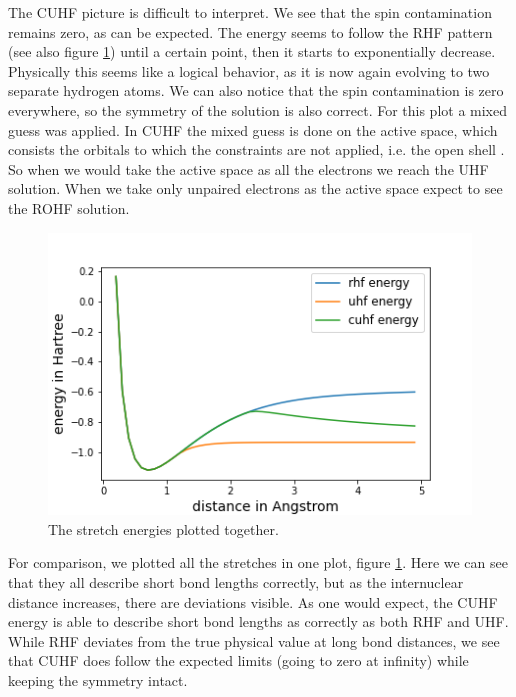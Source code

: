 The CUHF picture is difficult to interpret. We see that the spin contamination remains zero, as can be expected. The energy seems to follow the RHF pattern (see also figure
\ref{fig:combo}) until a certain point, then it starts to exponentially decrease. Physically this seems like a logical behavior, as it is now again evolving to two separate hydrogen
atoms. We can also notice
that the spin contamination is zero everywhere, so the symmetry of the solution is also correct. For this plot a mixed guess was applied. In CUHF the mixed guess is done on the
active space, which consists the orbitals to which the constraints are not applied, i.e. the open shell \cite{Scuseria2011}. So when we would take the active space as all the electrons
we reach the UHF solution. When we take only unpaired electrons as the active space expect to see the ROHF solution.
\begin{center}
  \begin{figure}[H]
    \centering
    \includegraphics[width=0.5\linewidth]{./img/combo.png}
    \caption{The stretch energies plotted together.}
    \label{fig:combo}
  \end{figure}
\end{center}
For comparison, we plotted all the stretches in one plot, figure \ref{fig:combo}. Here we can see that they all describe short bond lengths correctly, but as the internuclear distance
increases, there are deviations visible. As one would expect, the CUHF energy is able to describe short bond lengths as correctly as both RHF and UHF. While RHF deviates from the
true physical value at long bond distances, we see that CUHF does follow the expected limits (going to zero at infinity) while keeping the symmetry intact. 


